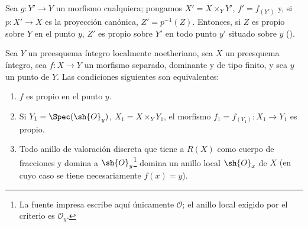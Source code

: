 Sea $g:Y'\to Y$ un morfismo cualquiera; pongamos $X'=X\times_Y Y'$, $f'=f_{(Y')}$ y, si $p:X'\to X$ es la proyección canónica, $Z'=p^{-1}(Z)$.
Entonces, si $Z$ es propio sobre $Y$ en el punto $y$, $Z'$ es propio sobre $Y'$ en todo punto $y'$ situado sobre $y$ ().

\begin{proposition}[15.7.2]
\label{IV.15.7.2}
Sea $Y$ un preesquema íntegro localmente noetheriano, sea $X$ un preesquema íntegro, sea $f:X\to Y$ un morfismo separado, dominante y de tipo finito, y sea $y$ un punto de $Y$.
Las condiciones siguientes son equivalentes:
\begin{enumerate}[label=\emph{\alph*)}]
  \item $f$ es propio en el punto $y$.
  \item Si $Y_1=\Spec(\sh{O}_y)$, $X_1=X\times_Y Y_1$, el morfismo $f_1=f_{(Y_1)}:X_1\to Y_1$ es propio.
  \item Todo anillo de valoración discreta que tiene a $R(X)$ como cuerpo de fracciones y domina a $\sh{O}_y$\footnote{La fuente impresa escribe aquí únicamente $\mathcal O$; el anillo local exigido por el criterio es $\mathcal O_y$.} domina un anillo local $\sh{O}_x$ de $X$ \textup{(en cuyo caso se tiene necesariamente $f(x)=y$)}.
\end{enumerate}
\end{proposition}

